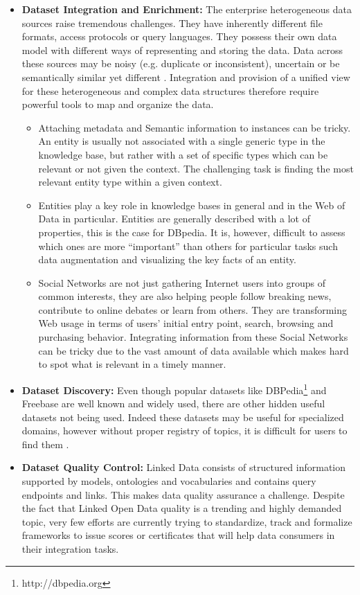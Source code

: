 \documentclass[onecolumn, crcready]{iosart2c}
\begin{document}
\begin{itemize}
\item {\bf Dataset Integration and Enrichment:} The enterprise heterogeneous data sources raise tremendous challenges. They have inherently different file formats, access protocols or query languages. They possess their own data model with different ways of representing and storing the data. Data across these sources may be noisy (e.g. duplicate or inconsistent), uncertain or be semantically similar yet different \cite{OntologyBasedSemantic}. Integration and provision of a unified view for these heterogeneous and complex data structures therefore require powerful tools to map and organize the data.
\begin{itemize}
	\item Attaching metadata and Semantic information to instances can be tricky. An entity is usually not associated with a single generic type in the knowledge base, but rather with a set of specific types which can be relevant or not given the context. The challenging task is finding the most relevant entity type within a given context.
	\item Entities play a key role in knowledge bases in general and in the Web of Data in particular. Entities are generally described with a lot of properties, this is the case for DBpedia. It is, however, difficult to assess which ones are more ``important'' than others for particular tasks such data augmentation and visualizing the key facts of an entity.
	\item Social Networks are not just gathering Internet users into groups of common interests, they are also helping people follow breaking news, contribute to online debates or learn from others. They are transforming Web usage in terms of users' initial entry point, search, browsing and purchasing behavior. Integrating information from these Social Networks can be tricky due to the vast amount of data available which makes hard to spot what is relevant in a timely manner.
\end{itemize}
\item {\bf Dataset Discovery:} Even though popular datasets like DBPedia\footnote{http://dbpedia.org} and Freebase are well known and widely used, there are other hidden useful datasets not being used. Indeed these datasets may be useful for specialized domains, however without proper registry of topics, it is difficult for users to find them \cite{AutomaticDomainIdentification}.
\item {\bf Dataset Quality Control:} Linked Data consists of structured information supported by models, ontologies and vocabularies and contains query endpoints and links. This makes data quality assurance a challenge. Despite the fact that Linked Open Data quality is a trending and highly demanded topic, very few efforts are currently trying to standardize, track and formalize frameworks to issue scores or certificates that will help data consumers in their integration tasks.
\end{itemize}
\end{document}
